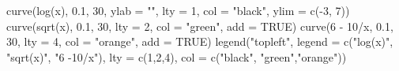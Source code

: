 \begin{Schunk}
\begin{Sinput}
 curve(log(x), 0.1, 30, ylab = "", lty = 1, col = "black", ylim = c(-3, 7))
 curve(sqrt(x), 0.1, 30, lty = 2, col = "green", add = TRUE)
 curve(6 - 10/x, 0.1, 30, lty = 4, col = "orange", add = TRUE)
 legend("topleft", legend = c("log(x)", "sqrt(x)", "6 -10/x"), lty = c(1,2,4), col = c("black", "green","orange"))
\end{Sinput}
\end{Schunk}

